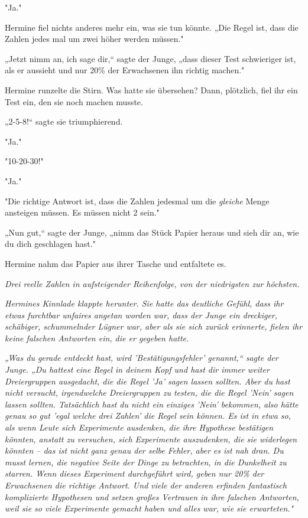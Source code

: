 {"Ja."

Hermine fiel nichts anderes mehr ein, was sie tun könnte. „Die Regel ist, dass die Zahlen jedes mal um zwei höher werden müssen."

„Jetzt nimm an, ich sage dir,“ sagte der Junge, „dass dieser Test schwieriger ist, als er aussieht und nur 20\% der Erwachsenen ihn richtig machen."

Hermine runzelte die Stirn. Was hatte sie übersehen? Dann, plötzlich, fiel ihr ein Test ein, den sie noch machen musste.

„2-5-8!“ sagte sie triumphierend.

"Ja."

"10-20-30!"

"Ja."

"Die richtige Antwort ist, dass die Zahlen jedesmal um die \emph{gleiche} Menge ansteigen müssen. Es müssen nicht 2 sein."

„Nun gut,“ sagte der Junge, „nimm das Stück Papier heraus und sieh dir an, wie du dich geschlagen hast."

Hermine nahm das Papier aus ihrer Tasche und entfaltete es.

\emph{Drei reelle Zahlen in aufsteigender Reihenfolge, von der niedrigsten zur höchsten.}

\emph{Hermines Kinnlade klappte herunter. Sie hatte das deutliche Gefühl, dass ihr etwas furchtbar unfaires angetan worden war, dass der Junge ein dreckiger, schäbiger, schummelnder Lügner war, aber als sie sich zurück erinnerte, fielen ihr keine falschen Antworten ein, die er gegeben hatte.}

\emph{„Was du gerade entdeckt hast, wird 'Bestätigungsfehler' genannt,“ sagte der Junge. „Du hattest eine Regel in deinem Kopf und hast dir immer weiter Dreiergruppen ausgedacht, die die Regel 'Ja' sagen lassen sollten. Aber du hast nicht versucht, irgendwelche Dreiergruppen zu testen, die die Regel 'Nein' sagen lassen sollten. Tatsächlich hast du nicht ein} \emph{\emph{einziges}} \emph{'Nein' bekommen, also hätte genau so gut 'egal welche drei Zahlen' die Regel sein können. Es ist in etwa so, als wenn Leute sich Experimente ausdenken, die ihre Hypothese bestätigen könnten, anstatt zu versuchen, sich Experimente auszudenken, die sie widerlegen könnten -- das ist nicht ganz genau der selbe Fehler, aber es ist nah dran. Du musst lernen, die negative Seite der Dinge zu betrachten, in die Dunkelheit zu starren. Wenn dieses Experiment durchgeführt wird, geben nur 20\% der Erwachsenen die richtige Antwort. Und viele der anderen erfinden fantastisch komplizierte Hypothesen und setzen großes Vertrauen in ihre falschen Antworten, weil sie so viele Experimente gemacht haben und alles war, wie sie erwarteten."}

}
